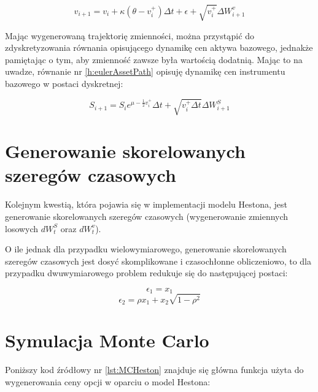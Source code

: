 \documentclass{pracamgr}
\begin{document}
\begin{equation}\label{h:eulerNonZero}
v_{i+1}  = v_i + \kappa (\theta - v_i^+) \Delta t + \epsilon +  \sqrt{v_i^+} \Delta W^{v}_{i+1}
\end{equation}

Mając wygenerowaną trajektorię zmienności, można przystąpić do zdyskretyzowania równania opisującego 
dynamikę cen aktywa bazowego, jednakże pamiętając o tym, aby zmienność zawsze była wartością dodatnią. 
Mając to na uwadze, równanie nr \ref{h:eulerAssetPath} opisuję dynamikę cen instrumentu bazowego w postaci dyskretnej:

\begin{equation}\label{h:eulerAssetPath}
S_{i+1} = S_i e^{\mu - \frac{1}{2} v_i^+} \Delta t + \sqrt{v_i^+ \Delta t}  \Delta W_{i+1}^S
\end{equation}
  
\section{Generowanie skorelowanych szeregów czasowych}

Kolejnym kwestią, która pojawia się w implementacji modelu Hestona, jest generowanie skorelowanych 
szeregów czasowych (wygenerowanie zmiennych losowych $dW^S_t$ oraz $dW^v_t$). 


O ile jednak dla przypadku wielowymiarowego, generowanie skorelowanych szeregów czasowych jest dosyć
skomplikowane i czasochłonne obliczeniowo, to dla przypadku dwuwymiarowego problem redukuje się do 
następującej postaci:

\begin{equation}
  \epsilon_1 = x_1
\end{equation}
\begin{equation}
  \epsilon_2 = \rho x_1 + x_2 \sqrt{1-\rho^2}
\end{equation}



\section{Symulacja Monte Carlo}


Poniższy kod źródłowy nr \ref{lst:MCHeston} znajduje się główna funkcja użyta do wygenerowania ceny 
opcji w oparciu o model Hestona:

\end{document}
